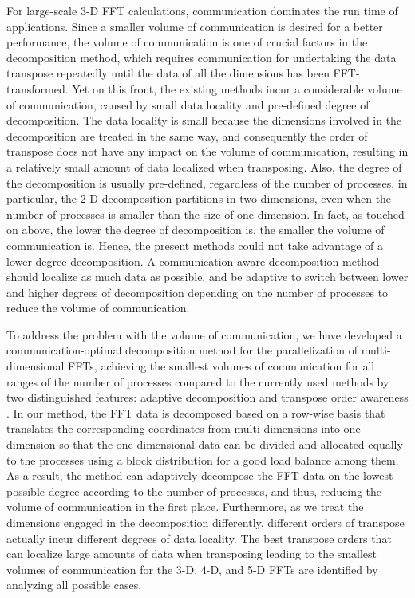 For large-scale 3-D FFT calculations, communication dominates the run time of applications. Since a smaller volume of communication is desired for a better performance, the volume of communication is one of crucial factors in the decomposition method, which requires communication for undertaking the data transpose repeatedly until the data of all the dimensions has been FFT-transformed. Yet on this front, the existing methods incur a considerable volume of communication, caused by small data locality and pre-defined degree of decomposition. The data locality is small because the dimensions involved in the decomposition are treated in the same way, and consequently the order of transpose does not have any impact on the volume of communication, resulting in a relatively small amount of data localized when transposing. Also, the degree of the decomposition is usually pre-defined, regardless of the number of processes, in particular, the 2-D decomposition partitions in two dimensions, even when the number of processes is smaller than the size of one dimension. In fact, as touched on above, the lower the degree of decomposition is, the smaller the volume of communication is. Hence, the present methods could not take advantage of a lower degree decomposition. A communication-aware decomposition method should localize as much data as possible, and be adaptive to switch between lower and higher degrees of decomposition depending on the number of processes to reduce the volume of communication.

To address the problem with the volume of communication, we have developed a communication-optimal decomposition method for the parallelization of multi-dimensional FFTs, achieving the smallest volumes of communication for all ranges of the number of processes compared to the currently used methods by two distinguished features: adaptive decomposition and transpose order awareness \cite{Duy2014153}. In our method, the FFT data is decomposed based on a row-wise basis that translates the corresponding coordinates from  multi-dimensions into one-dimension so that the one-dimensional data can be divided and allocated equally to the processes using a block distribution for a good load balance among them. As a result, the method can adaptively decompose the FFT data on the lowest possible degree according to the number of processes, and thus, reducing the volume of communication in the first place. Furthermore, as we treat the dimensions engaged in the decomposition differently, different orders of transpose actually incur different degrees of data locality. The best transpose orders that can localize large amounts of data when transposing leading to the smallest volumes of communication for the 3-D, 4-D, and 5-D FFTs are identified by analyzing all possible cases. 

